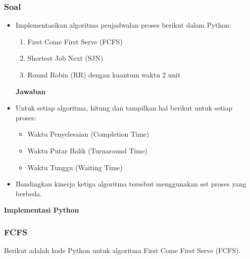\documentclass[12pt]{article}
\begin{document}
\subsubsection{Soal}
\begin{itemize}
    \item Implementasikan algoritma penjadwalan proses berikut dalam Python:
        \begin{enumerate}
            \item First Come First Serve (FCFS)
            \item Shortest Job Next (SJN)
            \item Round Robin (RR) dengan kuantum waktu 2 unit
        \end{enumerate}
        
\textbf{Jawaban}
    \item Untuk setiap algoritma, hitung dan tampilkan hal berikut untuk setiap proses:
        \begin{itemize}
            \item Waktu Penyelesaian (Completion Time)
            \item Waktu Putar Balik (Turnaround Time)
            \item Waktu Tunggu (Waiting Time)
        \end{itemize}
    \item Bandingkan kinerja ketiga algoritma tersebut menggunakan set proses yang berbeda.
\end{itemize}

\textbf{Implementasi Python}

\subsubsection{FCFS}
Berikut adalah kode Python untuk algoritma First Come First Serve (FCFS).
\end{document}

